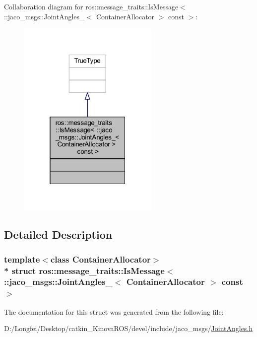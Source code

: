 Collaboration diagram for ros\+:\+:message\+\_\+traits\+:\+:Is\+Message$<$ \+:\+:jaco\+\_\+msgs\+:\+:Joint\+Angles\+\_\+$<$ Container\+Allocator $>$ const $>$\+:
\nopagebreak
\begin{figure}[H]
\begin{center}
\leavevmode
\includegraphics[width=193pt]{d1/d68/structros_1_1message__traits_1_1IsMessage_3_01_1_1jaco__msgs_1_1JointAngles___3_01ContainerAlloc4cbb1d9330bfeac4605aabeec5c67df0}
\end{center}
\end{figure}


\subsection{Detailed Description}
\subsubsection*{template$<$class Container\+Allocator$>$\\*
struct ros\+::message\+\_\+traits\+::\+Is\+Message$<$ \+::jaco\+\_\+msgs\+::\+Joint\+Angles\+\_\+$<$ Container\+Allocator $>$ const  $>$}



The documentation for this struct was generated from the following file\+:\begin{DoxyCompactItemize}
\item 
D\+:/\+Longfei/\+Desktop/catkin\+\_\+\+Kinova\+R\+O\+S/devel/include/jaco\+\_\+msgs/\hyperlink{JointAngles_8h}{Joint\+Angles.\+h}\end{DoxyCompactItemize}
